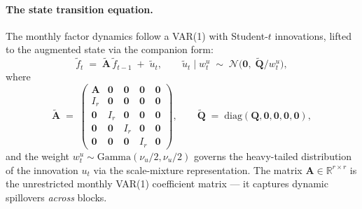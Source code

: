 \documentclass[11pt, a4paper, oneside]{article}
\begin{document}
\paragraph{The state transition equation.}
The monthly factor dynamics follow a VAR(1) with Student-$t$ innovations,
lifted to the augmented state via the companion form:
\begin{equation}
\tilde{f}_t \;=\; \tilde{\mathbf{A}}\, \tilde{f}_{t-1} \;+\; \tilde{u}_t,
\qquad
\tilde{u}_t \mid w^u_t \;\sim\; \mathcal{N}\!\big(\mathbf{0},\; \tilde{\mathbf{Q}}/w^u_t\big),
\label{eq:final-state}
\end{equation}
where
\[
\tilde{\mathbf{A}} \;=\; \begin{pmatrix}
\mathbf{A} & \mathbf{0} & \mathbf{0} & \mathbf{0} & \mathbf{0} \\
I_r & \mathbf{0} & \mathbf{0} & \mathbf{0} & \mathbf{0} \\
\mathbf{0} & I_r & \mathbf{0} & \mathbf{0} & \mathbf{0} \\
\mathbf{0} & \mathbf{0} & I_r & \mathbf{0} & \mathbf{0} \\
\mathbf{0} & \mathbf{0} & \mathbf{0} & I_r & \mathbf{0}
\end{pmatrix},
\qquad
\tilde{\mathbf{Q}} \;=\; \mathrm{diag}(\mathbf{Q}, \mathbf{0}, \mathbf{0}, \mathbf{0}, \mathbf{0}),
\]
and the weight $w^u_t \sim \mathrm{Gamma}(\nu_u/2, \nu_u/2)$ governs
the heavy-tailed distribution of the innovation $u_t$ via the
scale-mixture representation. The matrix $\mathbf{A} \in \mathbb{R}^{r \times r}$ is the unrestricted monthly VAR(1) coefficient matrix — it
captures dynamic spillovers \emph{across} blocks.
\end{document}
